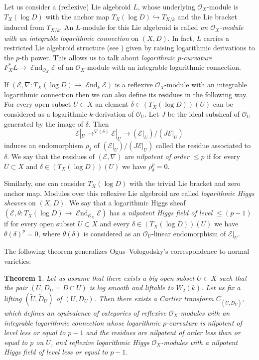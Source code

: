\documentclass[12pt]{article}
\theoremstyle{plain}
\newtheorem{Theorem}[Thm]{\sc Theorem}
\theoremstyle{definition}
\theoremstyle{remark}
\newcommand{\cE}{{\mathcal E}}
\newcommand{\cO}{{\mathcal O}}
\newcommand{\End}{{\mathop{{\mathcal E}nd}}}
\begin{document}
Let us consider a (reflexive) Lie algebroid $L$, whose underlying $\cO_X$-module is $T_X(\log D)$ with the
anchor map $T_X (\log D)\hookrightarrow T_{X/k}$ and the Lie bracket induced from $T_{X/k}$.
An $L$-module for this Lie algebroid is called \emph{an $\cO_X$-module with an integrable logarithmic connection } on $(X,D)$. In fact, $L$ carries a restricted Lie algebroid structure 
(see \cite[Section 4]{La2}) given by raising logarithmic derivations to the $p$-th power.
This allows us to talk about \emph{logarithmic $p$-curvature $F_X^*L\to \End _{\cO_X} \cE$}
of an $\cO_X$-module with an integrable logarithmic connection.

If $(\cE , \nabla : T_{X} (\log D)\to \End _k \cE)$ is a reflexive $\cO_X$-module with an integrable logarithmic connection then we can also define its residues in the following way.
For every open subset $U\subset X$ an element $\delta \in  (T_{X} (\log D) )(U)$ can be considered as a logarithmic $k$-derivation of $\cO_U$. Let $J$ be the ideal subsheaf of $\cO_U$ generated by the image of $\delta$. Then 
$$ \cE |_U\mathop{\longrightarrow}^{\nabla (\delta)} \cE |_U\to (\cE |_U)/( J\cE |_U)$$  
induces an endomorphism $\rho _{\delta} $ of $(\cE |_U)/( J\cE |_U)$ called the residue associated to $\delta$. 
We say that the residues of $(\cE , \nabla)$ are \emph{nilpotent of order $\le p$} if for every $U\subset X$ and $\delta  \in  (T_{X} (\log D) )(U)$ we have $\rho _{\delta}^p=0$.

\medskip

Similarly, one can consider $T_X(\log D)$ with the trivial Lie bracket and zero anchor map. 
Modules over this reflexive Lie algebroid are called \emph{logarithmic Higgs sheaves} on $(X,D)$.
We say that a logarithmic Higgs sheaf $(\cE, \theta : T_X(\log D)\to \End_{\cO_X} \cE)$ has \emph{ a nilpotent Higgs field of level $\le (p-1)$} if for every open subset $U\subset X$ and every 
$\delta  \in  (T_{X} (\log D) )(U)$ we have $\theta (\delta) ^p=0$, where $\theta (\delta)$ is considered as an $\cO_U$-linear endomorphism of $\cE |_U$.
 
\medskip

The following theorem generalizes Ogus--Vologodsky's correspondence to normal varieties:

\begin{Theorem}\label{log-smooth-OV-correspondence}
  Let us assume that there exists a big open subset $U\subset X$ such that the pair
$(U, D_U=D\cap U)$ is log smooth and liftable to $W_2(k)$. Let us fix
 a lifting $(\tilde U, \tilde D_U)$ of $(U, D_U)$. Then there exists a Cartier
  transform $C_{(\tilde U,\tilde D_U)}$, which defines an equivalence of
  categories of reflexive $\cO_X$-modules with an integrable
  logarithmic connection whose logarithmic $p$-curvature is nilpotent
  of level less or equal to $p-1$ and the residues are nilpotent of
  order less than or equal to $p$ on $U$, and reflexive logarithmic Higgs
  $\cO_X$-modules with a nilpotent Higgs field of level less or equal
  to $p-1$.
\end{Theorem}
\end{document}

